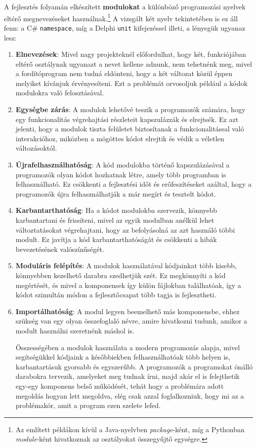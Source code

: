 \documentclass[tocnopagenum]{thesis-ekf}
\theoremstyle{definition}
\theoremstyle{remark}
\begin{document}
	A fejlesztés folyamán elkészített \textbf{modulokat} a különböző programozási nyelvek eltérő megnevezéseket használnak.\footnote{Az említett példákon kívül a Java-nyelvben \textit{package}-ként, míg a Pythonban \textit{module}-ként hivatkoznak az osztályokat összegyűjtő egységre.} A vizsgált két nyelv tekintetében is ez áll fenn: a C\# \verb|namespace|, míg a Delphi \verb|unit| kifejezéssel illeti, a lényegük ugyanaz lesz: 
	\begin{enumerate}
		\item \textbf{Elnevezések}: Mivel nagy projekteknél előfordulhat, hogy két, funkciójában eltérő osztálynak ugyanazt a nevet kellene adnunk, nem tehetnénk meg, mivel a fordítóprogram nem tudná eldönteni, hogy a két változat közül éppen melyiket kívánjuk érvényesíteni. Ezt a problémát orvosoljuk például a kódok modulokra való felosztásával.
		
		\item \textbf{Egységbe zárás}: A modulok lehetővé teszik a programozók számára, hogy egy funkcionalitás végrehajtási részleteit kapszulázzák és elrejtsék. Ez azt jelenti, hogy a modulok tiszta felületet biztosítanak a funkcionalitással való interakcióhoz, miközben a mögöttes kódot elrejtik és védik a véletlen változásoktól.
		
		\item \textbf{Újrafelhasználhatóság}: A kód modulokba történő kapszulázásával a programozók olyan kódot hozhatnak létre, amely több programban is felhasználható. Ez csökkenti a fejlesztési időt és erőfeszítéseket azáltal, hogy a programozók újra felhasználhatják a már megírt és tesztelt kódot.
		
		\item \textbf{Karbantarthatóság}: Ha a kódot modulokba szervezik, könnyebb karbantartani és frissíteni, mivel az egyik modulban anélkül lehet változtatásokat végrehajtani, hogy az befolyásolná az azt használó többi modult. Ez javítja a kód karbantarthatóságát és csökkenti a hibák bevezetésének valószínűségét.
		
		\item \textbf{Moduláris felépítés}: A modulok használatával kódjainkat több kisebb, könnyebben kezelhető darabra szedhetjük szét. Ez megkönnyíti a kód megértését, és mivel a komponensek így külön fájlokban találhatóak, így a kódot szimultán módon a fejlesztőcsapat több tagja is fejlesztheti.
		
		\item \textbf{Importálhatóság}: A modul legyen beemelhető más komponensbe, ehhez szükség van egy olyan összefoglaló névre, amire hivatkozni tudunk, amikor a modult használni szeretnénk máshol is.
		
		Összességében a modulok használata a modern programozás alapja, mivel segítségükkel kódjaink a későbbiekben felhasználhatóak több helyen is, karbantartásuk gyorsabb és egyszerűbb. A programozók a programokat önálló darabokra tervezik, amelyeket meg tudnak írni, majd akár el is felejthetik egy-egy komponens belső működését, tehát hogy a problémára adott megoldás hogyan lett megoldva, elég csak azzal foglalkozniuk, hogy mi az a problémakör, amit a program ezen szelete lefed.
	\end{enumerate} \cite{delphi_basics}
	
\end{document}

